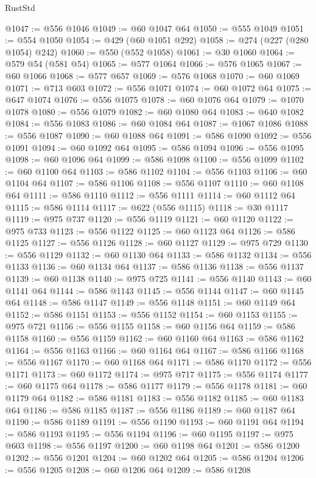 \begin{lexlean}{RustStd}
\begin{coremodule}
@1047 := @556 @1046
@1049 := @60 @1047 @64
@1050 := @555 @1049
@1051 := @554 @1050
@1054 := @429 (@60 @1051 @292)
@1058 := @274 (@227 (@280 @1054) @242)
@1060 := @550 (@552 @1058)
@1061 := @30 @1060
@1064 := @579 @54 (@581 @54)
@1065 := @577 @1064
@1066 := @576 @1065
@1067 := @60 @1066
@1068 := @577 @657
@1069 := @576 @1068
@1070 := @60 @1069
@1071 := @713 @603
@1072 := @556 @1071
@1074 := @60 @1072 @64
@1075 := @647 @1074
@1076 := @556 @1075
@1078 := @60 @1076 @64
@1079 := @1070 @1078
@1080 := @556 @1079
@1082 := @60 @1080 @64
@1083 := @640 @1082
@1084 := @556 @1083
@1086 := @60 @1084 @64
@1087 := @1067 @1086
@1088 := @556 @1087
@1090 := @60 @1088 @64
@1091 := @586 @1090
@1092 := @556 @1091
@1094 := @60 @1092 @64
@1095 := @586 @1094
@1096 := @556 @1095
@1098 := @60 @1096 @64
@1099 := @586 @1098
@1100 := @556 @1099
@1102 := @60 @1100 @64
@1103 := @586 @1102
@1104 := @556 @1103
@1106 := @60 @1104 @64
@1107 := @586 @1106
@1108 := @556 @1107
@1110 := @60 @1108 @64
@1111 := @586 @1110
@1112 := @556 @1111
@1114 := @60 @1112 @64
@1115 := @586 @1114
@1117 := @622 (@556 @1115)
@1118 := @30 @1117
@1119 := @975 @737
@1120 := @556 @1119
@1121 := @60 @1120
@1122 := @975 @733
@1123 := @556 @1122
@1125 := @60 @1123 @64
@1126 := @586 @1125
@1127 := @556 @1126
@1128 := @60 @1127
@1129 := @975 @729
@1130 := @556 @1129
@1132 := @60 @1130 @64
@1133 := @586 @1132
@1134 := @556 @1133
@1136 := @60 @1134 @64
@1137 := @586 @1136
@1138 := @556 @1137
@1139 := @60 @1138
@1140 := @975 @725
@1141 := @556 @1140
@1143 := @60 @1141 @64
@1144 := @586 @1143
@1145 := @556 @1144
@1147 := @60 @1145 @64
@1148 := @586 @1147
@1149 := @556 @1148
@1151 := @60 @1149 @64
@1152 := @586 @1151
@1153 := @556 @1152
@1154 := @60 @1153
@1155 := @975 @721
@1156 := @556 @1155
@1158 := @60 @1156 @64
@1159 := @586 @1158
@1160 := @556 @1159
@1162 := @60 @1160 @64
@1163 := @586 @1162
@1164 := @556 @1163
@1166 := @60 @1164 @64
@1167 := @586 @1166
@1168 := @556 @1167
@1170 := @60 @1168 @64
@1171 := @586 @1170
@1172 := @556 @1171
@1173 := @60 @1172
@1174 := @975 @717
@1175 := @556 @1174
@1177 := @60 @1175 @64
@1178 := @586 @1177
@1179 := @556 @1178
@1181 := @60 @1179 @64
@1182 := @586 @1181
@1183 := @556 @1182
@1185 := @60 @1183 @64
@1186 := @586 @1185
@1187 := @556 @1186
@1189 := @60 @1187 @64
@1190 := @586 @1189
@1191 := @556 @1190
@1193 := @60 @1191 @64
@1194 := @586 @1193
@1195 := @556 @1194
@1196 := @60 @1195
@1197 := @975 @603
@1198 := @556 @1197
@1200 := @60 @1198 @64
@1201 := @586 @1200
@1202 := @556 @1201
@1204 := @60 @1202 @64
@1205 := @586 @1204
@1206 := @556 @1205
@1208 := @60 @1206 @64
@1209 := @586 @1208

\end{coremodule}
\end{lexlean}
